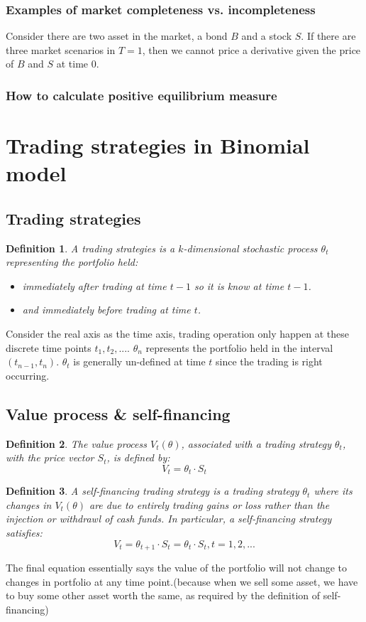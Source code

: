 \documentclass[a4paper,13pt]{report}
\newtheorem*{definition}{Definition}
\begin{document}
\subsubsection{Examples of market completeness vs. incompleteness}
Consider there are two asset in the market, a bond $B$ and a stock $S$. If there are three market scenarios in $T=1$, then we cannot price a derivative given the price of $B$ and $S$ at time 0.

\subsubsection{How to calculate positive equilibrium measure}

\section{Trading strategies in Binomial model}
\subsection{Trading strategies}
\begin{definition}
A trading strategies is a $k$-dimensional stochastic process $\theta_t$ representing the portfolio held:
\begin{itemize}
    \item immediately after trading at time $t-1$ so it is know at time $t-1$.
    \item and immediately before trading at time $t$.
\end{itemize}
\end{definition}
Consider the real axis as the time axis, trading operation only happen at these discrete time points $t_1,t_2,...$. $\theta_n$ represents the portfolio held in the interval $(t_{n-1},t_{n})$. $\theta_t$ is generally un-defined at time $t$ since the trading is right occurring.

\subsection{Value process \& self-financing}
\begin{definition}
The value process $V_t(\theta)$, associated with a trading strategy $\theta_t$, with the price vector $S_t$, is defined by:
$$V_t = \theta_t \cdot S_t$$
\end{definition}

\begin{definition}
A self-financing trading strategy is a trading strategy $\theta_t$ where its changes in $V_t(\theta)$ are due to entirely trading gains or loss rather than the injection or withdrawl of cash funds. In particular, a self-financing strategy satisfies:
$$V_t = \theta_{t+1}\cdot S_t = \theta_t \cdot S_t, t=1,2,...$$
\end{definition}
The final equation essentially says the value of the portfolio will not change to changes in portfolio at any time point.(because when we sell some asset, we have to buy some other asset worth the same, as required by the definition of self-financing) 
\end{document}
